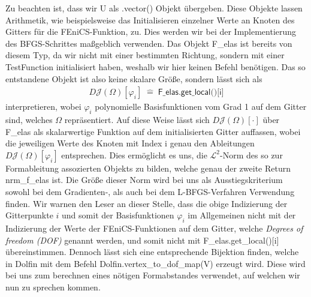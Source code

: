 Zu beachten ist, dass wir \textsf{U} als \textsf{.vector()} Objekt übergeben. Diese Objekte lassen Arithmetik, wie beispielsweise das Initialisieren einzelner Werte an Knoten des Gitters für die FEniCS-Funktion, zu. Dies werden wir bei der Implementierung des BFGS-Schrittes maßgeblich verwenden. Das Objekt \textsf{F\_elas} ist bereits von diesem Typ, da wir nicht mit einer bestimmten Richtung, sondern mit einer \textsf{TestFunction} initialisiert haben, weshalb wir hier keinen Befehl benötigen. Das so entstandene Objekt ist also keine skalare Größe, sondern lässt sich als
\begin{align}\label{felas}
	D\mathcal{J}(\Omega)[\varphi_i] \; \hat{=}\; \textsf{F\_elas.get\_local()[i]}
\end{align}
interpretieren, wobei $\varphi_i$ polynomielle Basisfunktionen vom Grad 1 auf dem Gitter sind, welches $\Omega$ repräsentiert. Auf diese Weise lässt sich $D\mathcal{J}(\Omega)[\cdot]$ über \textsf{F\_elas} als skalarwertige Funktion auf dem initialisierten Gitter auffassen, wobei die jeweiligen Werte des Knoten mit Index \textsf{i} genau den Ableitungen $D\mathcal{J}(\Omega)[\varphi_i]$ entsprechen. Dies ermöglicht es uns, die $\mathcal{L}^2$-Norm des so zur Formableitung assozierten Objekts zu bilden, welche genau der zweite Return \textsf{nrm\_f\_elas} ist. 
Die Größe dieser Norm wird bei uns als Ausstiegskriterium sowohl bei dem Gradienten-, als auch bei dem L-BFGS-Verfahren Verwendung finden.
Wir warnen den Leser an dieser Stelle, dass die obige Indizierung der Gitterpunkte $i$ und somit der Basisfunktionen $\varphi_i$ im Allgemeinen nicht mit der Indizierung der Werte der FEniCS-Funktionen auf dem Gitter, welche \textit{Degrees of freedom (DOF)} genannt werden, und somit nicht mit \textsf{F\_elas.get\_local()[i]} übereinstimmen. Dennoch lässt sich eine entsprechende Bijektion finden, welche in \textsf{Dolfin} mit dem Befehl \textsf{Dolfin.vertex\_to\_dof\_map(V)} erzeugt wird. Diese wird bei uns zum berechnen eines nötigen Formabstandes verwendet, auf welchen wir nun zu sprechen kommen.

